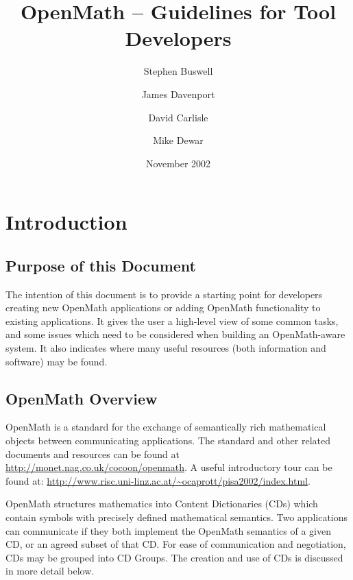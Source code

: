 \documentclass[report,keylogo]{openmath}
\begin{document}
\title{OpenMath -- Guidelines for Tool Developers}
\author{Stephen Buswell}
\address{Stilo}
\author{James Davenport}
\address{Univ.Bath}
\author{David Carlisle}
\address{NAG}
\author{Mike Dewar}
\address{NAG}

\date{November 2002}
\def\arccot{\mathop{\rm arccot}}
\def\arctanD{\underbrace{\mathop{\rm arctan}\nolimits{}}_{\mathop{\rm Derive}\nolimits}}
\let\rule\endgraf
\def\C{\mathbb{C}}
\def\R{\mathbb{R}}
\def\K{\mathcal{K}}
\let\subsubsubsection\paragraph
\let\subsubsubsubsection\subparagraph
\setcounter{secnumdepth}{6}
\setcounter{tocdepth}{3}
\maketitle
\tableofcontents

\section {Introduction}

\subsection {Purpose of this Document}
The intention of this document is to provide a starting point for
developers creating new OpenMath applications or adding OpenMath
functionality to existing applications. It gives the user a high-level
view of some common tasks, and some issues which need to be considered
when building an OpenMath-aware system. It also indicates where many
useful resources (both information and software) may be found.

\subsection {OpenMath Overview} 

OpenMath is a standard for the exchange of semantically rich
mathematical objects between communicating applications. The standard
and other related documents and resources can be found at
\url{http://monet.nag.co.uk/cocoon/openmath}.  A useful introductory
tour can be found at:
\url{http://www.risc.uni-linz.ac.at/~ocaprott/pisa2002/index.html}.

OpenMath structures mathematics into Content Dictionaries (CDs) which
contain symbols with precisely defined mathematical semantics. Two
applications can communicate if they both implement the OpenMath
semantics of a given CD, or an agreed subset of that CD. For ease of
communication and negotiation, CDs may be grouped into CD Groups.  The
creation and use of CDs is discussed in more detail below.
\end{document}
